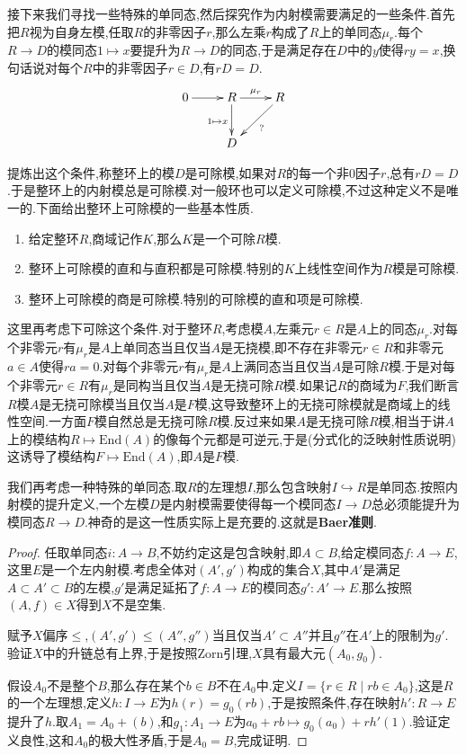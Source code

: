 接下来我们寻找一些特殊的单同态,然后探究作为内射模需要满足的一些条件.首先把$R$视为自身左模,任取$R$的非零因子$r$,那么左乘$r$构成了$R$上的单同态$\mu_r$.每个$R\to D$的模同态$1\mapsto x$要提升为$R\to D$的同态,于是满足存在$D$中的$y$使得$ry=x$,换句话说对每个$R$中的非零因子$r\in D$,有$rD=D$.
$$\xymatrix{0\ar[r]&R\ar[d]_{1\mapsto x}\ar[r]^{\mu_r}&R\ar[dl]^{?}\\&D}$$

提炼出这个条件,称整环上的模$D$是可除模,如果对$R$的每一个非0因子$r$,总有$rD=D$.于是整环上的内射模总是可除模.对一般环也可以定义可除模,不过这种定义不是唯一的.下面给出整环上可除模的一些基本性质.
\begin{enumerate}
	\item 给定整环$R$,商域记作$K$,那么$K$是一个可除$R$模.
	\item 整环上可除模的直和与直积都是可除模.特别的$K$上线性空间作为$R$模是可除模.
	\item 整环上可除模的商是可除模.特别的可除模的直和项是可除模.
\end{enumerate}

这里再考虑下可除这个条件.对于整环$R$,考虑模$A$,左乘元$r\in R$是$A$上的同态$\mu_r$.对每个非零元$r$有$\mu_r$是$A$上单同态当且仅当$A$是无挠模,即不存在非零元$r\in R$和非零元$a\in A$使得$ra=0$.对每个非零元$r$有$\mu_r$是$A$上满同态当且仅当$A$是可除$R$模.于是对每个非零元$r\in R$有$\mu_r$是同构当且仅当$A$是无挠可除$R$模.如果记$R$的商域为$F$,我们断言$R$模$A$是无挠可除模当且仅当$A$是$F$模,这导致整环上的无挠可除模就是商域上的线性空间.一方面$F$模自然总是无挠可除$R$模.反过来如果$A$是无挠可除$R$模,相当于讲$A$上的模结构$R\mapsto\mathrm{End}(A)$的像每个元都是可逆元,于是(分式化的泛映射性质说明)这诱导了模结构$F\mapsto\mathrm{End}(A)$,即$A$是$F$模.

我们再考虑一种特殊的单同态.取$R$的左理想$I$,那么包含映射$I\hookrightarrow R$是单同态.按照内射模的提升定义,一个左模$D$是内射模需要使得每一个模同态$I\to D$总必须能提升为模同态$R\to D$.神奇的是这一性质实际上是充要的.这就是\textbf{Baer准则}.
\begin{proof}
	
	任取单同态$i:A\to B$,不妨约定这是包含映射,即$A\subset B$,给定模同态$f:A\to E$,这里$E$是一个左内射模.考虑全体对$(A',g')$构成的集合$X$,其中$A'$是满足$A\subset A'\subset B$的左模,$g'$是满足延拓了$f:A\to E$的模同态$g':A'\to E$.那么按照$(A,f)\in X$得到$X$不是空集.
	
	赋予$X$偏序$\le$,$(A',g')\le(A'',g'')$当且仅当$A'\subset A''$并且$g''$在$A'$上的限制为$g'$.验证$X$中的升链总有上界,于是按照Zorn引理,$X$具有最大元$(A_0,g_0)$.
	
	假设$A_0$不是整个$B$,那么存在某个$b\in B$不在$A_0$中.定义$I=\{r\in R\mid rb\in A_0\}$,这是$R$的一个左理想,定义$h:I\to E$为$h(r)=g_0(rb)$,于是按照条件,存在映射$h':R\to E$提升了$h$.取$A_1=A_0+(b)$,和$g_1:A_1\to E$为$a_0+rb\mapsto g_0(a_0)+rh'(1)$.验证定义良性,这和$A_0$的极大性矛盾,于是$A_0=B$,完成证明.
\end{proof}

